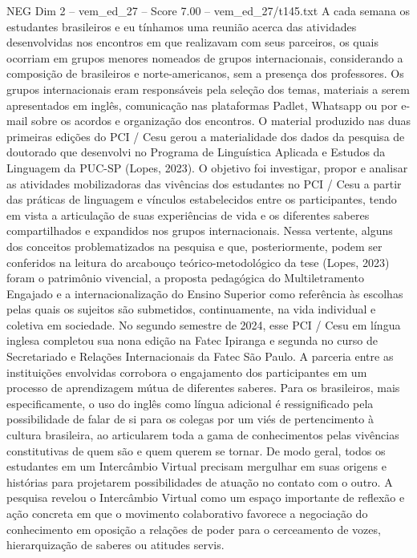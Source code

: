 \begin{textsample}{NEG Dim 2 – vem\_ed\_27 – Score 7.00 – vem\_ed\_27/t145.txt}
A cada semana os estudantes brasileiros e eu tínhamos uma reunião acerca das atividades desenvolvidas nos encontros em que realizavam com seus parceiros, os quais ocorriam em grupos menores nomeados de grupos internacionais, considerando a composição de brasileiros e norte-americanos, sem a presença dos professores.
Os grupos internacionais eram responsáveis pela seleção dos temas, materiais a serem apresentados em inglês, comunicação nas plataformas Padlet, Whatsapp ou por e-mail sobre os acordos e organização dos encontros.
O material produzido nas duas primeiras edições do PCI / Cesu gerou a materialidade dos dados da pesquisa de doutorado que desenvolvi no Programa de Linguística Aplicada e Estudos da Linguagem da PUC-SP (Lopes, 2023).
O objetivo foi investigar, propor e analisar as atividades mobilizadoras das vivências dos estudantes no PCI / Cesu a partir das práticas de linguagem e vínculos estabelecidos entre os participantes, tendo em vista a articulação de suas experiências de vida e os diferentes saberes compartilhados e expandidos nos grupos internacionais.
Nessa vertente, alguns dos conceitos problematizados na pesquisa e que, posteriormente, podem ser conferidos na leitura do arcabouço teórico-metodológico da tese (Lopes, 2023) foram o patrimônio vivencial, a proposta pedagógica do Multiletramento Engajado e a internacionalização do Ensino Superior como referência às escolhas pelas quais os sujeitos são submetidos, continuamente, na vida individual e coletiva em sociedade.
No segundo semestre de 2024, esse PCI / Cesu em língua inglesa completou sua nona edição na Fatec Ipiranga e segunda no curso de Secretariado e Relações Internacionais da Fatec São Paulo.
A parceria entre as instituições envolvidas corrobora o engajamento dos participantes em um processo de aprendizagem mútua de diferentes saberes.
Para os brasileiros, mais especificamente, o uso do inglês como língua adicional é ressignificado pela possibilidade de falar de si para os colegas por um viés de pertencimento à cultura brasileira, ao articularem toda a gama de conhecimentos pelas vivências constitutivas de quem são e quem querem se tornar.
De modo geral, todos os estudantes em um Intercâmbio Virtual precisam mergulhar em suas origens e histórias para projetarem possibilidades de atuação no contato com o outro.
A pesquisa revelou o Intercâmbio Virtual como um espaço importante de reflexão e ação concreta em que o movimento colaborativo favorece a negociação do conhecimento em oposição a relações de poder para o cerceamento de vozes, hierarquização de saberes ou atitudes servis.

\end{textsample}
